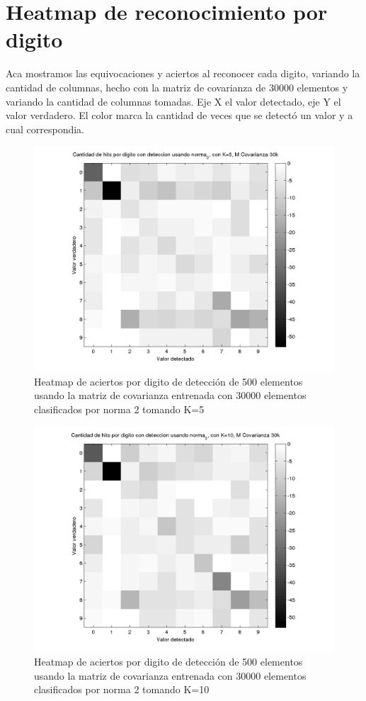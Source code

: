 \section{Heatmap de reconocimiento por digito}
Aca mostramos las equivocaciones y aciertos al reconocer cada digito, variando la cantidad de columnas, hecho con la matriz de covarianza de
30000 elementos y variando la cantidad de columnas tomadas. Eje X el valor detectado, eje Y el valor verdadero. El color marca la cantidad
de veces que se detect\'o un valor y a cual correspondia.
\def \hmwidth {500pt}
\begin{figure}[H]
\includegraphics[width=\hmwidth]{plots/heatmap-30kcv-k5-norma_2.png}
\caption{Heatmap de aciertos por digito de detecci\'on de 500 elementos usando la matriz de covarianza entrenada con 30000 elementos
clasificados por norma 2 tomando K=5}
\label{fig:HM30kcv-k5}
\end{figure}

\begin{figure}[H]
\includegraphics[width=\hmwidth]{plots/heatmap-30kcv-k10-norma_2.png}
\caption{Heatmap de aciertos por digito de detecci\'on de 500 elementos usando la matriz de covarianza entrenada con 30000 elementos
clasificados por norma 2 tomando K=10 }
\label{fig:HM30kcv-k10}
\end{figure}

